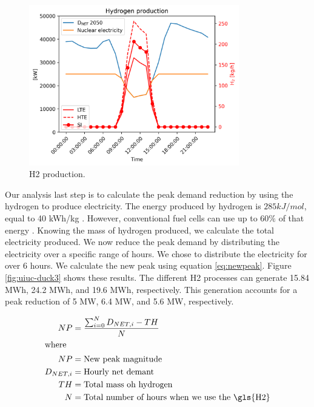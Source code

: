 
\begin{figure}[htbp!]
		\centering
	\includegraphics[height=7cm]{figures-hydro/uiuc-hydro2B}
	\hfill
	\caption{\gls{H2} production.}
	\label{fig:uiuc-duck2}
\end{figure}

Our analysis last step is to calculate the peak demand reduction by using the hydrogen to produce electricity.
The energy produced by hydrogen is $285 kJ/mol$, equal to 40 kWh/kg \cite{ursua_hydrogen_2012}.
However, conventional fuel cells can use up to 60$\%$ of that energy \cite{doe_energy_efficiency_and_renewable_energy_fuel_2015}.
Knowing the mass of hydrogen produced, we calculate the total electricity produced.
We now reduce the peak demand by distributing the electricity over a specific range of hours.
We chose to distribute the electricity for over 6 hours.
We calculate the new peak using equation \ref{eq:newpeak}.
Figure \ref{fig:uiuc-duck3} shows these results.
The different \gls{H2} processes can generate 15.84 MWh, 24.2 MWh, and 19.6 MWh, respectively.
This generation accounts for a peak reduction of 5 MW, 6.4 MW, and 5.6 MW, respectively.

\begin{align}
	NP &= \frac{\sum_{i=0}^{N} D_{NET, i} - TH}{N} \\
	\label{eq:newpeak}
	\intertext{where}
		NP &= \mbox{New peak magnitude} \\
		D_{NET, i} &= \mbox{Hourly net demant} \\
		TH &= \mbox{Total mass oh hydrogen} \\
		N &= \mbox{Total number of hours when we use the \gls{H2}}
\end{align}

